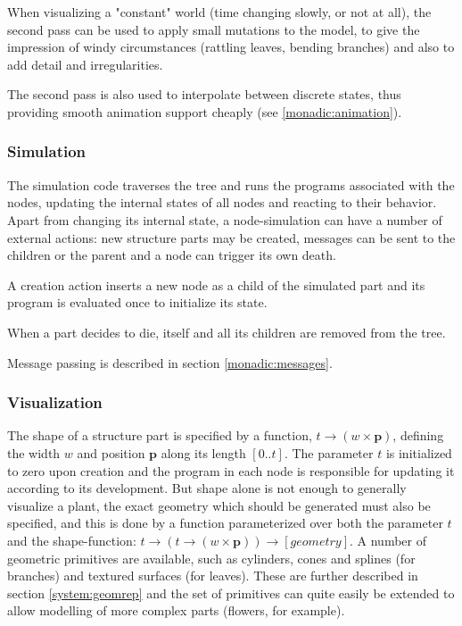     When visualizing a "constant" world (time changing slowly, or not
    at all), the second pass can be used to apply small mutations to
    the model, to give the impression of windy circumstances (rattling
    leaves, bending branches) and also to add detail and
    irregularities.

    The second pass is also used to interpolate between discrete
    states, thus providing smooth animation support cheaply
    (see \ref{monadic:animation}).


\subsubsection{Simulation}

    The simulation code traverses the tree and runs the programs
    associated with the nodes, updating the internal states of all
    nodes and reacting to their behavior. Apart from changing its
    internal state, a node-simulation can have a number of external
    actions: new structure parts may be created, messages can be sent
    to the children or the parent and a node can trigger its own
    death.

    A creation action inserts a new node as a child of the simulated
    part and its program is evaluated once to initialize its state.

    When a part decides to die, itself and all its children are
    removed from the tree.

    Message passing is described in section \ref{monadic:messages}.


\subsubsection{Visualization}

    \label{monadic:viz}

    The shape of a structure part is specified by a function, $ t
    \rightarrow (w \times \mathbf{p}) $, defining the width $w$ and position
    $\mathbf{p}$ along its length $[0..t]$. The parameter $t$ is
    initialized to zero upon creation and the program in each node is
    responsible for updating it according to its development.
    But shape alone is not enough to generally visualize a plant, the
    exact geometry which should be generated must also be specified,
    and this is done by a function parameterized over both the
    parameter $t$ and the shape-function: $ t \rightarrow
    (t \rightarrow (w \times \mathbf{p})) \rightarrow
    [\mathit{geometry}] $. A number of geometric primitives are
    available, such as cylinders, cones and splines (for branches) and
    textured surfaces (for leaves). These are further described in
    section \ref{system:geomrep} and the set of primitives can quite
    easily be extended to allow modelling of more complex parts
    (flowers, for example). 
 
